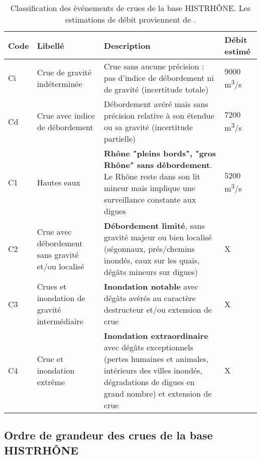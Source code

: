 \documentclass[11pt]{article}
\begin{document}
\begin{table}[h]
	\centering
	\caption{Classification des événements de crues de la base HISTRHÔNE. Les estimations de débit proviennent de \citet{pichard_hydro-climatology_2017}.}
	\label{tab:CatCrueHistrhone}
		\begin{tabular}{|m{1cm}|m{5cm}|m{8cm}|m{2.5cm}|}
		\hline
		Code &
		  Libellé &
		  Description &
		  Débit estimé \\ \hline
		Ci &
		  Crue de gravité indéterminée &
		  Crue sans aucune précision : pas d'indice de débordement ni de gravité (incertitude totale) &
		  9000 m\textsuperscript{3}/s \\ \hline
		Cd &
		  Crue avec indice de débordement &
		  Débordement avéré mais sans précision relative à son étendue ou sa gravité (incertitude partielle) &
		  7200 m\textsuperscript{3}/s \\ \hline
		C1 &
		  Hautes eaux &
		  
\textbf{Rhône "pleins bords", "gros Rhône" sans débordement}. Le Rhône reste dans son lit mineur mais implique une surveillance constante aux digues &
		  5200 m\textsuperscript{3}/s \\ \hline
		C2 &
		  Crue avec débordement sans gravité et/ou localisé &
		 
\textbf{Débordement limité}, sans gravité majeur ou bien localisé (ségonnaux, prés/chemins inondés, eaux sur les quais, dégâts mineurs sur digues) &
		  X \\ \hline
		C3 &
		  Crues et inondation de gravité intermédiaire &
		  
\textbf{Inondation notable} avec dégâts avérés au caractère destructeur et/ou extension de crue &
		  X \\ \hline
		C4 &
		  Crue et inondation extrême &
\textbf{Inondation extraordinaire} avec dégâts exceptionnels (pertes humaines et animales, intérieurs des villes inondés, dégradations de digues en grand nombre) et extension de crue &
		  X \\ \hline
		\end{tabular}
\end{table}
	
\FloatBarrier

	\subsection{Ordre de grandeur des crues de la base HISTRHÔNE}
	
\end{document}
